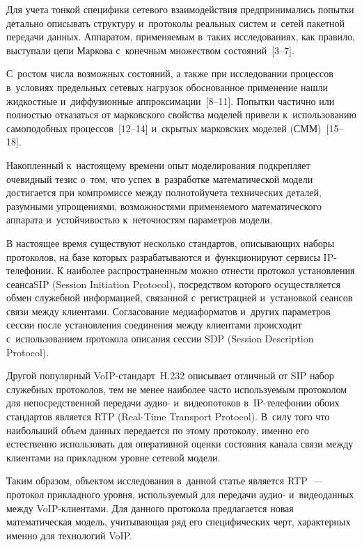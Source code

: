 \begin{multicols}{2}
Для учета тонкой специфики сетевого взаимодействия предпринимались
попытки детально описывать структуру и~протоколы реальных систем 
и~сетей пакетной передачи данных. Аппаратом, применяемым в~таких
исследованиях, как правило, выступали цепи Маркова с~конечным
множеством состояний~[3--7]. %

С~ростом числа возможных состояний, а также при исследовании
процессов в~условиях предельных сетевых нагрузок обоснованное
применение нашли жидкостные и~диффузионные 
аппроксимации~[8--11]. %
Попытки частично или полностью отказаться от
марковского свойства моделей привели к~использованию самоподобных
процессов~[12--14] %
и~скрытых марковских моделей (СММ)~[15--18].

Накопленный к~настоящему времени опыт моделирования подкрепляет
очевидный тезис о~том, что успех в~разработке математической модели
дости\-га\-ет\-ся при компромиссе между полнотой\linebreak учета технических
деталей, разумными упрощениями, возможностями применяемого
математического аппарата и~устойчивостью к~неточностям параметров
модели.

В настоящее время существуют несколько стандартов, описывающих
наборы протоколов, на базе которых разрабатываются и~функционируют
сервисы IP-телефонии. К наиболее распространенным можно отнести
протокол установления сеанса\linebreak SIP (Session Initiation Protocol),
посредством которого осуществляется обмен служебной информацией,
связанной с~регистрацией и~установкой сеансов связи между клиентами.
Согласование медиаформатов и~других параметров сессии  после
уста\-нов\-ления соединения между клиентами происходит с~использованием
протокола описания сессии SDP (Session Description Protocol). 

Другой
популярный VoIP-стан\-дарт~H.232 описывает отличный от SIP набор
служебных протоколов, тем не менее наиболее часто используемым
протоколом для непосредственной передачи аудио- и~видеопотоков 
в~IP-те\-ле\-фо\-нии обоих стандартов является RTP (Real-Time Transport
Protocol). В~силу того что наибольший объем данных передается по
этому протоколу, именно его естественно использовать для оперативной
оценки состояния канала связи между клиентами на прикладном уровне
сетевой модели.

Таким образом, объектом исследования в~данной статье является RTP~---
протокол прикладного уровня, используемый для передачи аудио- 
и~видеоданных между VoIP-кли\-ен\-та\-ми. Для данного протокола предлагается
новая математическая модель, учитывающая ряд его специфических черт,
характерных именно для технологий VoIP.


\end{multicols}
